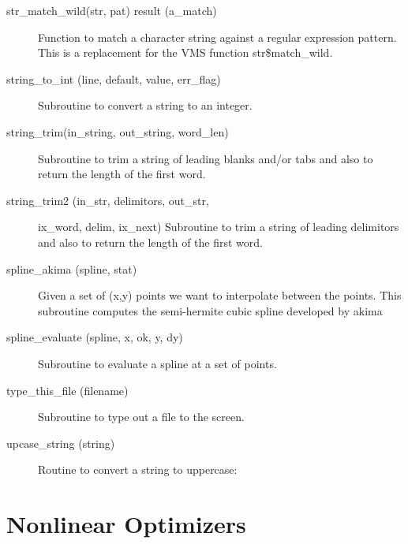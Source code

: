 \begin{description}
\item[str_match_wild(str, pat) result (a_match)] \Newline 
Function to match a character string against a regular expression pattern.
This is a replacement for the VMS function str\$match_wild.

\item[string_to_int (line, default, value, err_flag)] \Newline 
Subroutine to convert a string to an integer.

\item[string_trim(in_string, out_string, word_len)] \Newline 
Subroutine to trim a string of leading blanks and/or tabs and also to return the
length of the first word.

\item[string_trim2 (in_str, delimitors, out_str,] \Newline 
                                     ix_word, delim, ix_next)
Subroutine to trim a string of leading delimitors and also to return the
length of the first word.

\item[spline_akima (spline, stat)] \Newline 
Given a set of (x,y) points we want to interpolate between the points.
This subroutine computes the semi-hermite cubic spline developed by akima

\item[spline_evaluate (spline, x, ok, y, dy)] \Newline 
Subroutine to evaluate a spline at a set of points.

\item[type_this_file (filename)] \Newline 
Subroutine to type out a file to the screen.

\item[upcase_string (string)] \Newline 
Routine to convert a string to uppercase:

\end{description}

\section{Nonlinear Optimizers}
\label{r:opti}      

